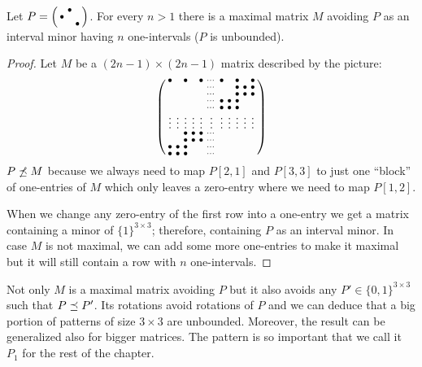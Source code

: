 \begin{thm}
\label{thm:manyints}
Let $P=\left(\begin{smallmatrix} &\bullet& \\\bullet& & \\ & &\bullet\end{smallmatrix}\right)$. For every $n>1$ there is a maximal matrix $M$ avoiding $P$ as an interval minor having $n$ one-intervals ($P$ is unbounded).
\end{thm}
\begin{proof} Let $M$ be a $(2n-1)\times(2n-1)$ matrix described by the picture:
$$\left(\begin{smallmatrix}	\bullet& &\bullet& &\bullet&\cdots&\bullet& &\bullet& &\bullet\\
		 & & & & &\cdots& & &\bullet&\bullet&\bullet\\
		 & & & & &\cdots& & &\bullet&\bullet&\bullet\\
		 & & & & &\cdots&\bullet&\bullet&\bullet& & \\
		 & & & & &\cdots&\bullet&\bullet&\bullet& & \\
		\vdots&\vdots&\vdots&\vdots&\vdots&\vdots&\vdots&\vdots&\vdots&\vdots&\vdots\\
		 & &\bullet&\bullet&\bullet&\cdots& & & & & \\
		 & &\bullet&\bullet&\bullet&\cdots& & & & & \\
		\bullet&\bullet&\bullet& & &\cdots& & & & & \\
		\bullet&\bullet&\bullet& & &\cdots& & & & & \\
		 \end{smallmatrix}\right)$$
$P\not\preceq M$ because we always need to map $P[2,1]$ and $P[3,3]$ to just one ``block'' of one-entries of $M$ which only leaves a zero-entry where we need to map $P[1,2]$.

When we change any zero-entry of the first row into a one-entry we get a matrix containing a minor of $\{1\}^{3\times3}$; therefore, containing $P$ as an interval minor. In case $M$ is not maximal, we can add some more one-entries to make it maximal but it will still contain a row with $n$ one-intervals.
\end{proof}

Not only $M$ is a maximal matrix avoiding $P$ but it also avoids any $P'\in\{0,1\}^{3\times3}$ such that $P\preceq P'$. Its rotations avoid rotations of $P$ and we can deduce that a big portion of patterns of size $3\times3$ are unbounded. Moreover, the result can be generalized also for bigger matrices. The pattern is so important that we call it $P_1$ for the rest of the chapter.

